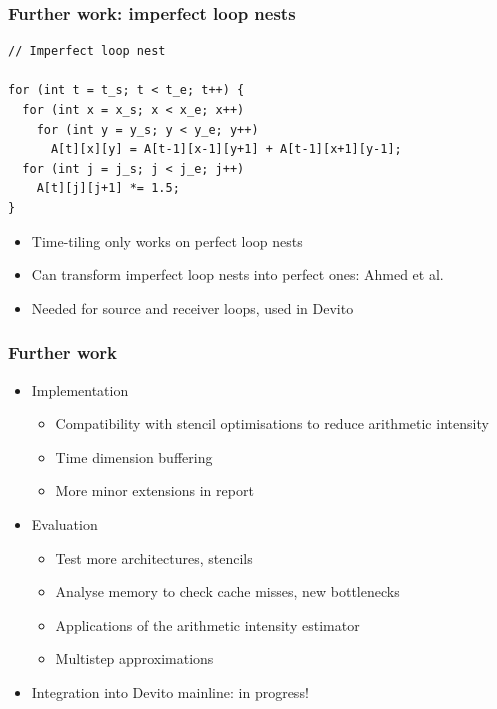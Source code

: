 \documentclass{beamer}
\begin{document}
\begin{frame}[fragile]
\frametitle{Further work: imperfect loop nests}

\begin{lstlisting}
// Imperfect loop nest

for (int t = t_s; t < t_e; t++) {
  for (int x = x_s; x < x_e; x++)
    for (int y = y_s; y < y_e; y++)
      A[t][x][y] = A[t-1][x-1][y+1] + A[t-1][x+1][y-1];
  for (int j = j_s; j < j_e; j++)
    A[t][j][j+1] *= 1.5;
}
\end{lstlisting}

\begin{itemize}
	\item Time-tiling only works on perfect loop nests
	\item Can transform imperfect loop nests into perfect ones: Ahmed et al.
	\item Needed for source and receiver loops, used in Devito
\end{itemize}
\end{frame}



\begin{frame}
\frametitle{Further work}

\begin{itemize}
	\item Implementation
	\begin{itemize}
		\item Compatibility with stencil optimisations to reduce arithmetic intensity
		\item Time dimension buffering
		\item More minor extensions in report
	\end{itemize}
	\item Evaluation
	\begin{itemize}
		\item Test more architectures, stencils
		\item Analyse memory to check cache misses, new bottlenecks
		\item Applications of the arithmetic intensity estimator
		\item Multistep approximations
	\end{itemize}
	\item Integration into Devito mainline: in progress!
\end{itemize}
\end{frame}



%
\end{document}
